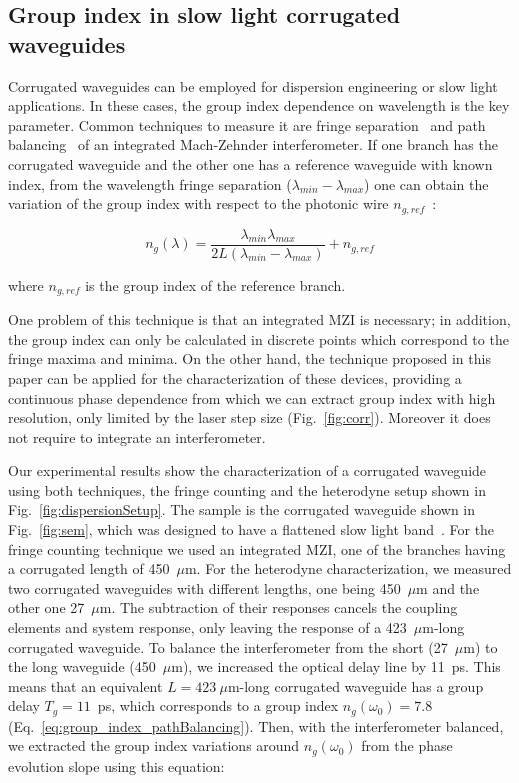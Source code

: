 \subsection{Group index in slow light corrugated waveguides}
\label{sec:corrWaveguides}
Corrugated waveguides can be employed for dispersion engineering or slow light applications. In these cases, the group index dependence on wavelength is the key parameter. Common techniques to measure it are fringe separation~\cite{shang81,vlasov:05,yao:811,Dulkeith2006} and path balancing~\cite{Cohen:82,Knox:88,Liang:98} of an integrated Mach-Zehnder interferometer. If one branch has the corrugated waveguide and the other one has a reference waveguide with known index, from the wavelength fringe separation ($ \lambda_{min} - \lambda_{max} $) one can obtain the variation of the group index with respect to the photonic wire $ n_{g,ref} $~\cite{vlasov:05}:


\begin{equation}
  n_g (\lambda)=\frac{\lambda_{min} \lambda_{max}}{ 2L (\lambda_{min} - \lambda_{max})} + n_{g,ref}
\label{eq:fringes}
\end{equation}

where $n_{g,ref}$ is the group index of the reference branch.

One problem of this technique is that an integrated MZI is necessary; in addition, the group index can only be calculated in discrete points which correspond to the fringe maxima and minima. On the other hand, the technique proposed in this paper can be applied for the characterization of these devices, providing a continuous phase dependence from which we can extract group index with high resolution, only limited by the laser step size (Fig.~\ref{fig:corr}). Moreover it does not require to integrate an interferometer.

Our experimental results show the characterization of a corrugated waveguide using both techniques, the fringe counting and the heterodyne setup shown in Fig.~\ref{fig:dispersionSetup}. The sample is the corrugated waveguide shown in Fig.~\ref{fig:sem}, which was designed to have a flattened slow light band~\cite{Brimont2010}. For the fringe counting technique we used an integrated MZI, one of the branches having a corrugated length of 450~$\mu$m. For the heterodyne characterization, we measured two corrugated waveguides with different lengths, one being 450~$\mu$m and the other one 27~$\mu$m. The subtraction of their responses cancels the coupling elements and system response, only leaving the response of a 423~$\mu$m-long corrugated waveguide.
To balance the interferometer from the short (27~$\mu$m) to the long waveguide (450~$\mu$m), we increased the optical delay line by 11~ps.
This means that an equivalent $L=423~\mu$m-long corrugated waveguide has a group delay $T_g=11$~ps, which corresponds to a group index $n_g(\omega_0)=7.8$ (Eq.~\ref{eq:group_index_pathBalancing}). Then, with the interferometer balanced, we extracted the group index variations around $n_g(\omega_0)$ from the phase evolution slope using this equation:

